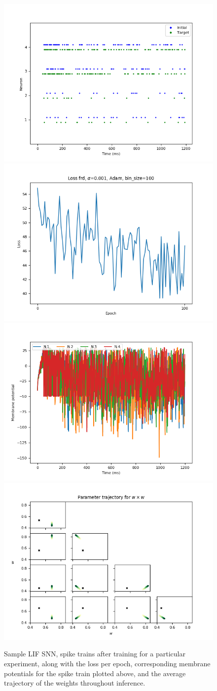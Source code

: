\documentclass[mphil,deptreport,ianc]{infthesis} %
\begin{document}
\begin{figure}
    \centering
    \includegraphics[width=0.5\columnwidth]{figures/samples/LIF/12-10_09-55-57-223/spike_trains_train_iter_100.png}
    \includegraphics[width=0.49\columnwidth]{figures/samples/LIF/12-10_09-55-57-223/plot_loss_test12-10_09-56-55-12812-10_09-56-55-128.png}
    \includegraphics[width=0.5\columnwidth]{figures/samples/LIF/12-10_09-55-57-223/membrane_pots_train_i_100.png}
    \includegraphics[width=0.49\columnwidth]{figures/samples/LIF/12-10_09-55-57-223/test_weights_inference_trajectories_param_w.png}
    
    \caption{Sample LIF SNN, spike trains after training for a particular experiment, along with the loss per epoch, corresponding membrane potentials for the spike train plotted above, and the average trajectory of the weights throughout inference.}
    \label{fig:sample_LIF_exp}
\end{figure}
\end{document}
